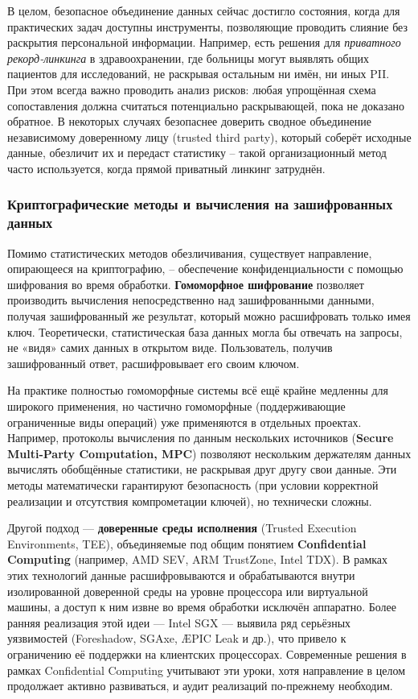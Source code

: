 В целом, безопасное объединение данных сейчас достигло
состояния, когда для практических задач доступны инструменты, позволяющие проводить слияние без раскрытия персональной
информации. Например, есть решения для \textit{приватного рекорд-линкинга} в здравоохранении, где больницы могут
выявлять общих пациентов для исследований, не раскрывая остальным ни имён, ни иных PII. При этом всегда важно проводить
анализ рисков: любая упрощённая схема сопоставления должна считаться потенциально раскрывающей, пока не доказано
обратное. В некоторых случаях безопаснее доверить сводное объединение независимому доверенному лицу (trusted third
party), который соберёт исходные данные, обезличит их и передаст статистику – такой организационный метод часто
используется, когда прямой приватный линкинг затруднён.

\subsubsection{Криптографические методы и вычисления на зашифрованных данных}

Помимо статистических методов обезличивания, существует направление, опирающееся на криптографию, – обеспечение
конфиденциальности с помощью шифрования во время обработки. \textbf{Гомоморфное шифрование} позволяет производить
вычисления непосредственно над зашифрованными данными, получая зашифрованный же результат, который можно расшифровать
только имея ключ. Теоретически, статистическая база данных могла бы отвечать на запросы, не «видя» самих данных в
открытом виде. Пользователь, получив зашифрованный ответ, расшифровывает его своим ключом.

На практике полностью
гомоморфные системы всё ещё крайне медленны для широкого применения, но частично гомоморфные (поддерживающие
ограниченные виды операций) уже применяются в отдельных проектах. Например, протоколы вычисления по данным нескольких
источников (\textbf{Secure Multi-Party Computation, MPC}) позволяют нескольким держателям данных вычислять обобщённые
статистики, не раскрывая друг другу свои данные. Эти методы математически гарантируют безопасность (при условии
корректной реализации и отсутствия компрометации ключей), но технически сложны.

Другой подход — \textbf{доверенные среды исполнения} (Trusted Execution Environments, TEE),
объединяемые под общим понятием \textbf{Confidential Computing} (например, AMD SEV, ARM TrustZone,
Intel TDX). В рамках этих технологий данные расшифровываются и обрабатываются внутри изолированной
доверенной среды на уровне процессора или виртуальной машины, а доступ к ним извне во время обработки
исключён аппаратно. Более ранняя реализация этой идеи — Intel SGX — выявила ряд серьёзных уязвимостей
(Foreshadow, SGAxe, ÆPIC Leak и др.), что привело к ограничению её поддержки на клиентских процессорах.
Современные решения в рамках Confidential Computing учитывают эти уроки, хотя направление в целом
продолжает активно развиваться, и аудит реализаций по-прежнему необходим.

